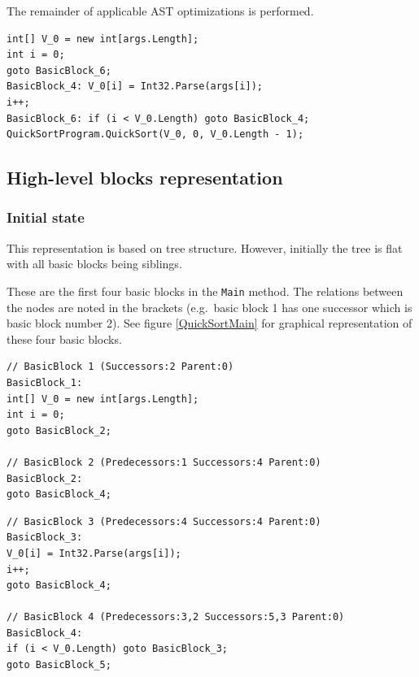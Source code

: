 \documentclass[12pt,twoside,notitlepage]{report}
\begin{document}
The remainder of applicable AST optimizations is performed.

\begin{verbatim}
int[] V_0 = new int[args.Length];
int i = 0;
goto BasicBlock_6;
BasicBlock_4: V_0[i] = Int32.Parse(args[i]);
i++;
BasicBlock_6: if (i < V_0.Length) goto BasicBlock_4; 
QuickSortProgram.QuickSort(V_0, 0, V_0.Length - 1);
\end{verbatim}

\subsection{High-level blocks representation}

\subsubsection{Initial state}

This representation is based on tree structure.  However,
initially the tree is flat with all basic blocks being siblings.

These are the first four basic blocks in the \verb|Main| method.
The relations between the nodes are noted in the brackets 
(e.g.\ basic block 1 has one successor which is basic block number 2).
See figure \ref{QuickSortMain} for graphical representation of
these four basic blocks.

\begin{verbatim}
// BasicBlock 1 (Successors:2 Parent:0)
BasicBlock_1:
int[] V_0 = new int[args.Length];
int i = 0;
goto BasicBlock_2;

// BasicBlock 2 (Predecessors:1 Successors:4 Parent:0)
BasicBlock_2:
goto BasicBlock_4;
\end{verbatim}
\begin{verbatim}
// BasicBlock 3 (Predecessors:4 Successors:4 Parent:0)
BasicBlock_3:
V_0[i] = Int32.Parse(args[i]);
i++;
goto BasicBlock_4;

// BasicBlock 4 (Predecessors:3,2 Successors:5,3 Parent:0)
BasicBlock_4:
if (i < V_0.Length) goto BasicBlock_3; 
goto BasicBlock_5;
\end{verbatim}
\end{document}
